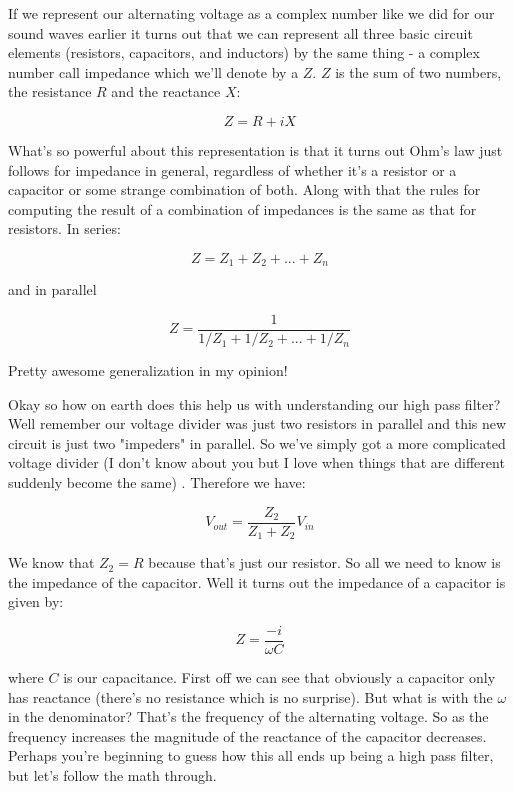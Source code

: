 \documentclass[12pt,a6paper]{book}
\begin{document}
If we represent our alternating voltage as a complex number like we did for our sound waves earlier it turns out that we can represent all three basic circuit elements (resistors, capacitors, and inductors) by the same thing - a complex number call impedance which we'll denote by a $Z$. $Z$ is the sum of two numbers, the resistance $R$ and the reactance $X$:

\begin{equation}
Z=R+iX
\end{equation}

What's so powerful about this representation is that it turns out Ohm's law just follows for impedance in general, regardless of whether it's a resistor or a capacitor or some strange combination of both. Along with that the rules for computing the result of a combination of impedances is the same as that for resistors. In series:

\begin{equation}
Z = Z_1 + Z_2 + ... + Z_n
\end{equation}

and in parallel

\begin{equation}
Z=\frac{1}{1/Z_1+1/Z_2 + ... + 1/Z_n}
\end{equation}

Pretty awesome generalization in my opinion! 

Okay so how on earth does this help us with understanding our high pass filter? Well remember our voltage divider was just two resistors in parallel and this new circuit is just two "impeders" in parallel. So we've simply got a more complicated voltage divider (I don't know about you but I love when things that are different suddenly become the same) \cite{artofelectronics}. Therefore we have:

\begin{equation}
V_{out}=\frac{Z_2}{Z_1 + Z_2}V_{in}
\end{equation}

We know that $Z_2=R$ because that's just our resistor. So all we need to know is the impedance of the capacitor. Well it turns out the impedance of a capacitor is given by:

\begin{equation}
Z=\frac{-i}{\omega C}
\end{equation}

where $C$ is our capacitance. First off we can see that obviously a capacitor only has reactance (there's no resistance which is no surprise). But what is with the $\omega$ in the denominator? That's the frequency of the alternating voltage. So as the frequency increases the magnitude of the reactance of the capacitor decreases. Perhaps you're beginning to guess how this all ends up being a high pass filter, but let's follow the math through. 
\end{document}
